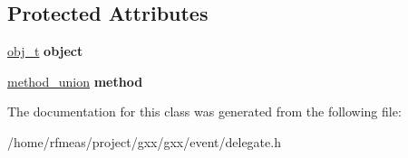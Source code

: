 \subsection*{Protected Attributes}
\begin{DoxyCompactItemize}
\item 
\hyperlink{classgxx_1_1AbstractDelegate}{obj\+\_\+t} {\bfseries object}\hypertarget{classgxx_1_1delegate_a4f01586b3720f0cdc4b50e6f8cedb08e}{}\label{classgxx_1_1delegate_a4f01586b3720f0cdc4b50e6f8cedb08e}

\item 
\hyperlink{uniongxx_1_1delegate_1_1method__union}{method\+\_\+union} {\bfseries method}\hypertarget{classgxx_1_1delegate_aae23f8e6e23ca3a5d8d764932e376ea0}{}\label{classgxx_1_1delegate_aae23f8e6e23ca3a5d8d764932e376ea0}

\end{DoxyCompactItemize}


The documentation for this class was generated from the following file\+:\begin{DoxyCompactItemize}
\item 
/home/rfmeas/project/gxx/gxx/event/delegate.\+h\end{DoxyCompactItemize}
